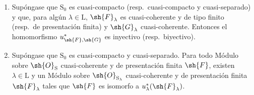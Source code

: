 \begin{theorem}[8.5.2]
\label{IV.8.5.2}
\begin{enumerate}[label=\textup{(\roman*)}]
  \item Supóngase que $\mathrm{S}_0$ es cuasi-compacto (resp.\ cuasi-compacto y cuasi-separado) y que, para algún $\lambda\in\mathrm{L}$, $\sh{F}_\lambda$ es cuasi-coherente y de tipo finito (resp.\ de presentación finita) y $\sh{G}_\lambda$ cuasi-coherente.
Entonces el homomorfismo $u_{\sh{F},\sh{G}}^*$ es inyectivo (resp.\ biyectivo).
  \item Supóngase que $\mathrm{S}_0$ es cuasi-compacto y cuasi-separado.
Para todo Módulo sobre $\sh{O}_\mathrm{S}$ cuasi-coherente y de presentación finita $\sh{F}$, existen $\lambda\in\mathrm{L}$ y un Módulo sobre $\sh{O}_{\mathrm{S}_\lambda}$ cuasi-coherente y de presentación finita $\sh{F}_\lambda$ tales que $\sh{F}$ es isomorfo a $u_\lambda^*(\sh{F}_\lambda)$.
\end{enumerate}
\end{theorem}

